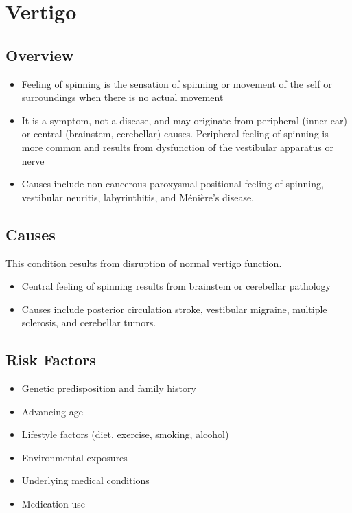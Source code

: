 \chapter{Vertigo}
\label{sec:Vertigo}

\section{Overview}


\begin{itemize}[noitemsep]
  \item Feeling of spinning is the sensation of spinning or movement of the self or surroundings when there is no actual movement
  \item It is a symptom, not a disease, and may originate from peripheral (inner ear) or central (brainstem, cerebellar) causes. Peripheral feeling of spinning is more common and results from dysfunction of the vestibular apparatus or nerve
  \item Causes include non-cancerous paroxysmal positional feeling of spinning, vestibular neuritis, labyrinthitis, and M\'{e}ni\`{e}re's disease.
\end{itemize}
\section{Causes}
This condition results from disruption of normal vertigo function.

\begin{itemize}[noitemsep]
  \item Central feeling of spinning results from brainstem or cerebellar pathology
  \item Causes include posterior circulation stroke, vestibular migraine, multiple sclerosis, and cerebellar tumors.
\end{itemize}
\section{Risk Factors}


\begin{itemize}[noitemsep]
  \item Genetic predisposition and family history
  \item Advancing age
  \item Lifestyle factors (diet, exercise, smoking, alcohol)
  \item Environmental exposures
  \item Underlying medical conditions
  \item Medication use
\end{itemize}
